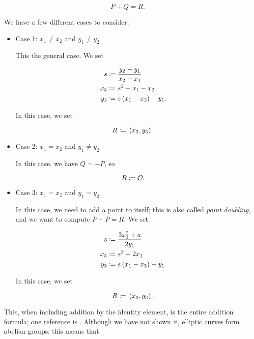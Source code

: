 \begin{equation}
    P + Q = R.
\end{equation}

\noindent
We have a few different cases to consider:

\begin{itemize}
\item Case 1: $x_{1}\ne x_{2}$ and $y_{1}\ne y_{2}$

This the general case.
We set

\begin{align}
    s &\coloneqq{} \frac{y_{2}-y_{1}}{x_{2}-x_{1}} \nonumber\\
    x_{3} &\coloneqq{} s^{2} - x_{1} - x_{2} \nonumber\\
    y_{3} &\coloneqq{} s\left( x_{1} - x_{3} \right) - y_{1}.
\end{align}

\noindent
In this case, we set

\begin{equation}
    R \coloneqq{} \left( x_{3},y_{3} \right).
\end{equation}

\item Case 2: $x_{1} = x_{2}$ and $y_{1}\ne y_{2}$

In this case, we have $Q = -P$, so

\begin{equation}
    R \coloneqq{} \mathcal{O}.
\end{equation}

\item Case 3: $x_{1} = x_{2}$ and $y_{1} = y_{2}$

In this case, we need to add a point to itself;
this is also called \emph{point doubling},
and we want to compute $P + P = R$.
We set

\begin{align}
    s &\coloneqq{} \frac{3x_{1}^{2} + a}{2y_{1}} \nonumber\\
    x_{3} &\coloneqq{} s^{2} - 2x_{1} \nonumber\\
    y_{3} &\coloneqq{} s\left( x_{1} - x_{3} \right) - y_{1}.
\end{align}

\noindent
In this case, we set

\begin{equation}
    R \coloneqq{} \left( x_{3},y_{3} \right).
\end{equation}
\end{itemize}

\noindent
This, when including addition by the identity element,
is the entire addition formula;
one reference is \cite[Proposition~9.70]{IntroModernCrypto}.
Although we have not shown it, \glspl{elliptic curve}
form \glspl{abelian group};
this means that

